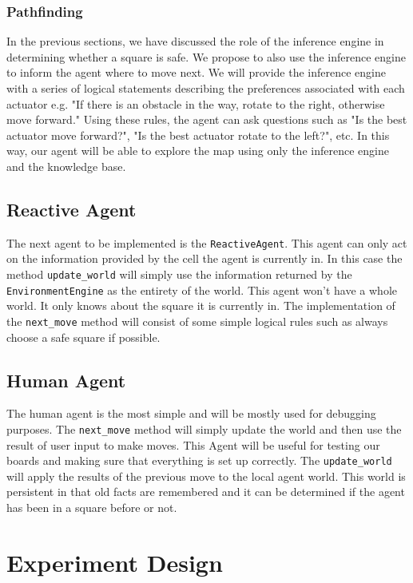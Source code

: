 \documentclass{article}
\begin{document}
			
			\subsubsection{Pathfinding}
			
				In the previous sections, we have discussed the role of the inference engine in determining whether a square is safe. We propose to also use the inference engine to inform the agent where to move next.
				We will provide the inference engine with a series of logical statements describing the preferences associated with each actuator e.g. "If there is an obstacle in the way, rotate to the right, otherwise move forward." Using these rules, the agent can ask questions such as "Is the best actuator move forward?", "Is the best actuator rotate to the left?", etc. In this way, our agent will be able to explore the map using only the inference engine and the knowledge base.
			
		\subsection{Reactive Agent}
			The next agent to be implemented is the \texttt{ReactiveAgent}. This agent can only act on the information provided by the cell the agent is currently in. In this case the method \texttt{update\_world} will simply use  the information returned by the \texttt{EnvironmentEngine} as the entirety of the world. This agent won't have a whole world. It only knows about the square it is currently in. The implementation of the \texttt{next\_move} method will consist of some simple logical rules such as always choose a safe square if possible.
		
		\subsection{Human Agent}
		 The human agent is the most simple and will be mostly used for debugging purposes. The \texttt{next\_move} method will simply update the world and then use the result of user input to make moves. This Agent will be useful for testing our boards and making sure that everything is set up correctly. The \texttt{update\_world} will apply the results of the previous move to the local agent world. This world is persistent in that old facts are remembered and it can be determined if the agent has been in a square before or not. 
	\section{Experiment Design}
	
\end{document}
